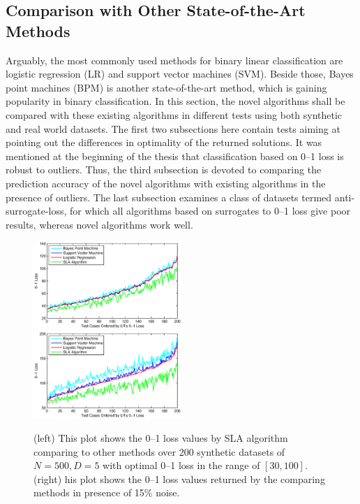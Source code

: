 \subsection{Comparison with Other State-of-the-Art Methods}
\label{sec:rc.others}

Arguably, the most commonly used methods for binary linear
classification are logistic regression (LR) and support vector
machines (SVM). Beside those, Bayes point machines (BPM) is another
state-of-the-art method, which is gaining popularity in binary
classification. In this section, the novel algorithms shall be
compared with these existing algorithms in different tests using both
synthetic and real world datasets. The first two subsections here
contain tests aiming at pointing out the differences in optimality of
the returned solutions. It was mentioned at the beginning of the
thesis that classification based on 0--1 loss is robust to
outliers. Thus, the third subsection is devoted to comparing the
prediction accuracy of the novel algorithms with existing algorithms
in the presence of outliers. The last subsection examines a class of
datasets termed anti-surrogate-loss, for which all algorithms based on
surrogates to 0--1 loss give poor results, whereas novel algorithms
work well.



\begin{figure}[ht!]
\includegraphics[width=0.50\textwidth]{images/fig61_621a.eps}
\includegraphics[width=0.50\textwidth]{images/fig61_621b.eps}
\caption{ (left) This plot shows the 0--1 loss values by SLA algorithm
  comparing to other methods over 200 synthetic datasets of $N=500,
  D=5$ with optimal 0--1 loss in the range of $[30, 100]$.  
  (right) his plot shows the 0--1 loss values returned by the
  comparing methods in presence of 15\% noise.}
\label{fig:621a}
\end{figure}

